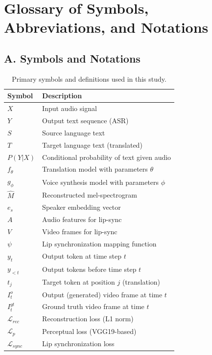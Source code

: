 \documentclass[12pt,oneside]{report}
\begin{document}
\tableofcontents
\newpage
\listoffigures
\newpage
\listoftables
\newpage
\chapter*{Glossary of Symbols, Abbreviations, and Notations}
\label{ch:glossary}
\section*{A. Symbols and Notations}

\begin{table}[H]
\centering
\caption{Primary symbols and definitions used in this study.}
\label{tab:symbols}
\renewcommand{\arraystretch}{1.05}
\setlength{\tabcolsep}{4.5pt}
\small
\begin{tabular}{@{}ll@{}}
\toprule
\textbf{Symbol} & \textbf{Description} \\
\midrule
$X$ & Input audio signal \\
$Y$ & Output text sequence (ASR) \\
$S$ & Source language text \\
$T$ & Target language text (translated) \\
$P(Y|X)$ & Conditional probability of text given audio \\
$f_{\theta}$ & Translation model with parameters $\theta$ \\
$g_{\phi}$ & Voice synthesis model with parameters $\phi$ \\
$\hat{M}$ & Reconstructed mel-spectrogram \\
$e_s$ & Speaker embedding vector \\
$A$ & Audio features for lip-sync \\
$V$ & Video frames for lip-sync \\
$\psi$ & Lip synchronization mapping function \\
$y_t$ & Output token at time step $t$ \\
$y_{<t}$ & Output tokens before time step $t$ \\
$t_j$ & Target token at position $j$ (translation) \\
$I_t^o$ & Output (generated) video frame at time $t$ \\
$I_t^{gt}$ & Ground truth video frame at time $t$ \\
$\mathcal{L}_{rec}$ & Reconstruction loss (L1 norm) \\
$\mathcal{L}_p$ & Perceptual loss (VGG19-based) \\
$\mathcal{L}_{sync}$ & Lip synchronization loss \\

\end{tabular}
\end{table}
\end{document}
